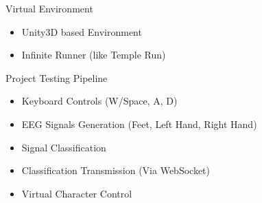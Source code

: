 \begin{frame}{Virtual Environment}
\begin{itemize}
    \item Unity3D based Environment
    \item Infinite Runner (like Temple Run)
\end{itemize}
\end{frame}

\begin{frame}{Project Testing Pipeline}
    \begin{itemize}
        \item Keyboard Controls (W/Space, A, D)
        \item EEG Signals Generation (Feet, Left Hand, Right Hand)
        \item Signal Classification
        \item Classification Transmission (Via WebSocket)
        \item Virtual Character Control
    \end{itemize}
\end{frame}